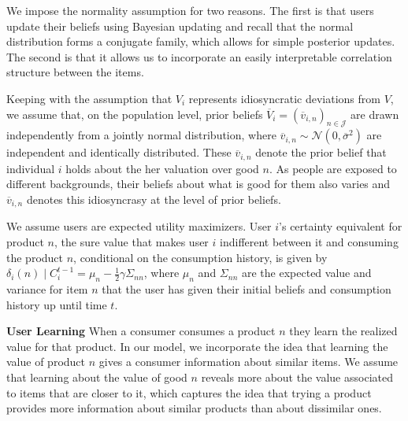 \documentclass[sigconf]{acmart}
\begin{document}
We impose the normality assumption for two reasons. The first is that users update their beliefs using Bayesian updating and recall that the normal distribution forms a conjugate family, which allows for simple posterior updates. The second is that it allows us to incorporate an easily interpretable correlation structure between the items.
\par
Keeping with the assumption that $V_i$ represents idiosyncratic deviations from $V$, we assume that, on the population level, prior beliefs $\overline V_i=\left(\overline v_{i,n}\right)_{n \in \mathcal{J}}$ are drawn independently from a jointly normal distribution, where $\overline v_{i,n} \sim \mathcal N (0, \overline \sigma^2)$ are independent and identically distributed. These $\overline v_{i,n}$ denote the prior belief that individual $i$ holds about the her valuation over good $n$. As people are exposed to different backgrounds, their beliefs about what is good for them also varies and $\overline v_{i,n}$ denotes this idiosyncrasy at the level of prior beliefs.
\par

We assume users are expected utility maximizers. User $i$'s certainty equivalent for product $n$, the sure value that makes user $i$ indifferent between it and consuming the product $n$, conditional on the consumption history, is given by
$\delta_{i}(n)\mid C_i^{t-1}=\mu_n-\frac{1}{2}\gamma \Sigma_{nn}$, where $\mu_n$ and $\Sigma_{nn}$ are the expected value and variance for item $n$ that the user has given their initial beliefs and consumption history up until time $t$.

\noindent \textbf{User Learning}
When a consumer consumes a product $n$ they learn the realized value for that product. In our model, we incorporate the idea that learning the value of product $n$ gives a consumer information about similar items. 
We assume that learning about the value of good $n$ reveals more about the value associated to items that are closer to it, which captures the idea that trying a product provides more information about similar products than about dissimilar ones.
\par
\end{document}
